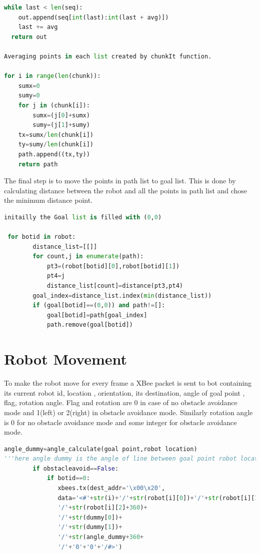 \documentclass[main.tex]{subfiles}
\begin{document}
\begin{enumerate}
\begin{lstlisting}[language=Python, caption = Point selection from a shape]
  while last < len(seq):
    out.append(seq[int(last):int(last + avg)])
    last += avg
  return out

Averaging points in each list created by chunkIt function.

for i in range(len(chunk)):
	sumx=0
    sumy=0
    for j in (chunk[i]):       
    	sumx=(j[0]+sumx)
        sumy=(j[1]+sumy)
    tx=sumx/len(chunk[i])
    ty=sumy/len(chunk[i])
    path.append((tx,ty))
    return path
\end{lstlisting}


The final step is to move the points in path list to goal list. This is done by calculating distance between the robot and all the points in path list and chose the minimum distance point.

\begin{lstlisting}[language=Python, caption = Goal allocation]
initailly the Goal list is filled with (0,0)  
 
 for botid in robot:
        distance_list=[[]]
        for count,j in enumerate(path):            
            pt3=(robot[botid][0],robot[botid][1])
            pt4=j
            distance_list[count]=distance(pt3,pt4)
        goal_index=distance_list.index(min(distance_list))
        if (goal[botid]==(0,0)) and path!=[]:
            goal[botid]=path[goal_index]
            path.remove(goal[botid])
\end{lstlisting}


\end{enumerate} 

\pagebreak	
\section{Robot Movement}
To make the robot move for every frame a XBee packet is sent to bot containing its current robot id, location , orientation, its destination, angle of goal point , flag, rotation angle.
Flag and rotation are 0 in case of no obstacle avoidance mode and 1(left) or 2(right) in obstacle avoidance mode.
Similarly rotation angle is 0 for no obstacle avoidance mode and some integer for obstacle avoidance mode.
\begin{lstlisting}[language=Python, caption = Robot Movement]
angle_dummy=angle_calculate(goal point,robot location)
'''here angle dummy is the angle of line between goal point robot location , w.r.t horizontal axis'''
        if obstacleavoid==False:
            if botid==0:
               xbees.tx(dest_addr='\x00\x20',
               data='<#'+str(i)+'/'+str(robot[i][0])+'/'+str(robot[i][1])+
               '/'+str(robot[i][2]+360)+
               '/'+str(dummy[0])+
               '/'+str(dummy[1])+
               '/'+str(angle_dummy+360+
               '/'+'0'+'0'+'/#>')
\end{lstlisting}
\pagebreak
\end{document}
